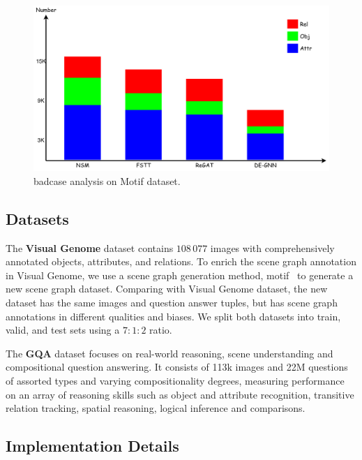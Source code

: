 \documentclass[letterpaper]{article} %
\begin{document}
\begin{figure}[ht]
    \includegraphics[width=1.0\textwidth]{./pic/badcase3.pdf} 
    \caption{badcase analysis on Motif dataset.} 
    \label{badcase} 
\end{figure}

\subsection{Datasets}

\quad The \textbf{Visual Genome} dataset contains $108 \, 077$ images with comprehensively annotated objects, attributes, and relations. To enrich the scene graph annotation in Visual Genome, we use a scene graph generation method, motif~\cite{DBLP:conf/cvpr/ZellersYTC18} to generate a new scene graph dataset. Comparing with Visual Genome dataset, the new dataset has the same images and question answer tuples, but has scene graph annotations in different qualities and biases. We split both datasets into train, valid, and test sets using a $7:1:2$ ratio. 

The \textbf{GQA} dataset focuses on real-world reasoning, scene understanding and compositional question answering. It consists of 113k images and 22M questions of assorted types and varying compositionality degrees, measuring performance on an array of reasoning skills such as object and attribute recognition, transitive relation tracking, spatial reasoning, logical inference and comparisons.



\subsection{Implementation Details}
\end{document}
